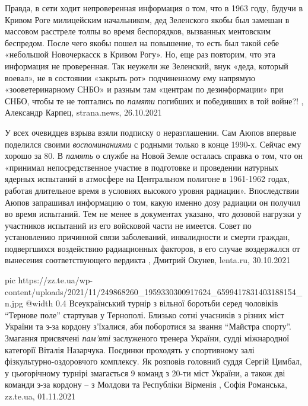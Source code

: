 Правда, в сети ходит непроверенная информация о том, что в 1963 году, будучи в
Кривом Роге милицейским начальником, дед Зеленского якобы был замешан в
массовом расстреле толпы во время беспорядков, вызванных ментовским беспредом.
После чего якобы пошел на повышение, то есть был такой себе «небольшой
Новочеркасск в Кривом Рогу». Но, еще раз повторим, что эта информация не
проверенная.  Так неужели же Зеленский, внук «деда, который воевал», не в
состоянии «закрыть рот» подчиненному ему напрямую «зооветеринарному СНБО» и
разным там «центрам по дезинформации» при СНБО, чтобы те не топтались по \emph{памяти}
погибших и победивших в той войне?!
, 
Александр Карпец, strana.news, 26.10.2021

У всех очевидцев взрыва взяли подписку о неразглашении. Сам Аюпов впервые
поделился своими \emph{воспоминаниями} с родными только в конце 1990-х. Сейчас ему
хорошо за 80. В \emph{память} о службе на Новой Земле осталась справка о том, что он
«принимал непосредственное участие в подготовке и проведении натурных ядерных
испытаний в атмосфере на Центральном полигоне в 1961-1962 годах, работая
длительное время в условиях высокого уровня радиации».
Впоследствии Аюпов запрашивал информацию о том, какую именно дозу радиации он
получил во время испытаний. Тем не менее в документах указано, что дозовой
нагрузки у участников испытаний из его войсковой части не имеется. Совет по
установлению причинной связи заболеваний, инвалидности и смерти граждан,
подвергшихся воздействию радиационных факторов, в его случае воздержался от
вынесения соответствующего вердикта
, Дмитрий Окунев, lenta.ru, 30.10.2021

\ifcmt
  pic https://zz.te.ua/wp-content/uploads/2021/11/249868260_1959330300917624_6599417831403188154_n.jpg
  @width 0.4
\fi
Всеукраїнський турнір з вільної боротьби серед чоловіків \enquote{Тернове поле}
стартував у Тернополі. Близько сотні учасників з різних міст України та з-за
кордону з’їхалися, аби поборотися за звання \enquote{Майстра спорту}.  Змагання
присвячені \emph{пам'яті} заслуженого тренера України, судді міжнародної категорії
Віталія Назарчука. Поєдинки проходять у спортивному залі
фізкультурно-оздоровчого комплексу.  Як розповів головний суддя Сергій Цимбал,
у цьогорічному турнірі змагається 9 команд з 20-ти міст України, а також дві
команди з-за кордону – з Молдови та Республіки Вірменія
, 
Софія Романська, zz.te.ua, 01.11.2021

